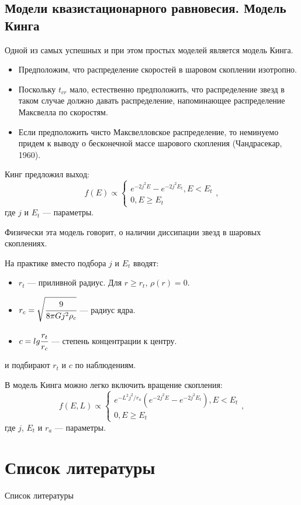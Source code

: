 \documentclass{beamer}
\begin{document}
\subsection{Модели квазистационарного равновесия. Модель Кинга}
\begin{frame}
Одной из самых успешных и при этом простых моделей является модель Кинга\cite{king}.
\begin{itemize}
    \item Предположим, что распределение скоростей в шаровом скоплении изотропно.
    \item Поскольку $t_{cr}$ мало, естественно предположить, что распределение звезд в таком случае должно давать распределение, напоминающее распределение Максвелла по скоростям.
    \item Если предположить чисто Максвелловское распределение, то неминуемо придем к выводу о бесконечной массе шарового скопления (Чандрасекар, 1960). 
\end{itemize}
\end{frame}
\begin{frame}
Кинг предложил выход:
\begin{equation*}
    f(E) \propto  \begin{cases}
        e^{-2j^2E} - e^{-2j^2E_t}, E < E_t \\
        0, E \geq E_t
    \end{cases},
\end{equation*}
где $j$ и $E_t$ --- параметры.
\par Физически эта модель говорит, о наличии диссипации звезд в шаровых скоплениях.
\end{frame}
\begin{frame}
    На практике вместо подбора $j$ и $E_t$ вводят:
    \begin{itemize}
        \item $r_t$ --- приливной радиус. Для $r \geq r_t$, $\rho(r) = 0$.
        \item $r_c = \sqrt{\cfrac{9}{8\pi G j^2 \rho_c}}$ --- радиус ядра.
        \item $c = lg \cfrac{r_t}{r_c}$ --- степень концентрации к центру.
    \end{itemize}
    и подбирают $r_t$ и $c$ по наблюдениям.
\end{frame}
\begin{frame}
В модель Кинга можно легко включить вращение скопления:
\begin{equation*}
    f(E, L) \propto  \begin{cases}
        e^{-L^2j^2/r_a}\left(e^{-2j^2E} - e^{-2j^2E_t}\right), E < E_t \\
        0, E \geq E_t
    \end{cases},
\end{equation*}
где $j$, $E_t$ и $r_a$ --- параметры.
\end{frame}
\section{Список литературы}
\begin{frame}[t, allowframebreaks]{Список литературы}
    
    
\end{frame}
\end{document}

